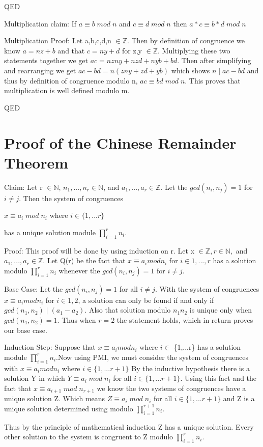 \documentclass{article}
\newcommand\tab[1][1cm]{\hspace*{#1}}
\begin{document}
QED\newline\newline

Multiplication claim: If $a \equiv b \; mod \; n$ and  $c \equiv d \; mod \; n$ then $a*c \equiv b*d \; mod \; n$

Multiplication Proof: Let a,b,c,d,n $\in \mathbb{Z}$. Then by definition of congruence we know $a = nz +b $ and that $c = ny+d$ for z,y $\in \mathbb{Z}$. Multiplying these two statements together we get $ac = nzny + nzd + nyb + bd$. Then after simplifying and rearranging we get $ac-bd = n(zny + zd + yb)$ which shows $n \mid ac-bd$ and thus by definition of congruence modulo n, $ac \equiv bd \; mod \; n$. This proves that multiplication is well defined modulo m.

QED
\pagebreak
\section{Proof of the Chinese Remainder Theorem}

Claim: Let r $\in \mathbb{N}$, $n_1, ... , n_r  \in \mathbb{N}$, and $a_1,...,a_r \in \mathbb{Z}$. Let the $gcd(n_i,n_j) =1$ for $i \neq j$. Then the system of congruences

\tab\tab\tab\tab $x \equiv a_i \; mod \; n_i$ where $i \in \{1,...r\}$

has a unique solution module $\prod_{i=1}^{r} n_i $.

Proof: This proof will be done by using induction on r. Let x $\in \mathbb{Z}, r\in \mathbb{N},$ and $a_1,..., a_r \in \mathbb{Z}$. Let Q(r) be the fact that $x \equiv a_i mod n_i$ for $i \in {1,...,r}$ has a solution modulo  $\prod_{i=1}^{r} n_i $ whenever the $gcd(n_i,n_j) =1$ for $i \neq j$.
\begin{adjustwidth}{1cm}{}
Base Case: Let the $gcd(n_i,n_j) = 1$ for all $i \neq j $. With the system of congruences $x \equiv a_i mod n_i$ for $i \in {1,2}$, a solution can only be found if and only if $gcd(n_1,n_2) \mid (a_1-a_2)$. Also that solution modulo $n_1n_2$ is unique only when $gcd(n_1,n_2) = 1$. Thus when $r=2$ the statement holds, which in return proves our base case.

Induction Step: Suppose that $x \equiv a_i mod n_i$ where $i \in$ \{1,...r\} has a solution module $\prod_{i=1}^{r} n_i $.Now using PMI, we must consider the system of congruences with  $x \equiv a_i mod n_i$  where $i \in \{1,...r+1\}$ By the inductive hypothesis there is a solution Y in which $Y \equiv a_i \; mod \; n_i$ for all $i \in \{1,...r+1\}$. Using this fact and the fact that  $x \equiv a_{i+1} \; mod \; n_{r+1}$ we know the two systems of congruences have a unique solution Z. Which means $Z \equiv a_{i} \; mod \; n_{i}$ for all $i \in \{1,...r+1\}$ and Z is a unique solution determined using modulo $\prod_{i=1}^{r+1} n_i $.
\end{adjustwidth}
Thus by the principle of mathematical induction Z has a unique solution. Every other solution to the system is congruent to Z modulo $\prod_{i=1}^{r} n_i $.
\end{document}
